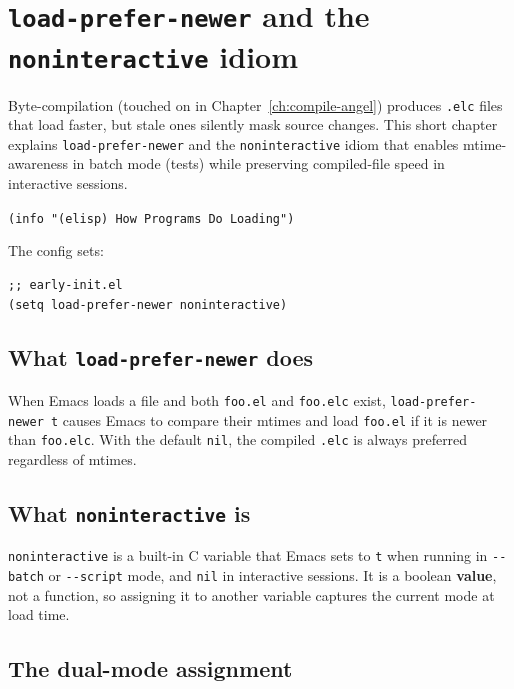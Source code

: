 \chapter{\texttt{load-prefer-newer} and the \texttt{noninteractive} idiom}
\label{ch:load-prefer-newer}
\minitoc\label{load-prefer-newer-and-the-noninteractive-idiom}

Byte-compilation (touched on in Chapter~\ref{ch:compile-angel})
produces \texttt{.elc} files that load faster, but stale ones
silently mask source changes.  This short
chapter explains \texttt{load-prefer-newer} and the
\texttt{noninteractive} idiom that enables mtime-awareness in batch
mode (tests) while preserving compiled-file speed in interactive
sessions.

\texttt{(info "(elisp) How Programs Do Loading")}

The config sets:

\begin{verbatim}
;; early-init.el
(setq load-prefer-newer noninteractive)
\end{verbatim}

\section{What \texttt{load-prefer-newer} does}\label{what-load-prefer-newer-does}

When Emacs loads a file and both \texttt{foo.el} and \texttt{foo.elc} exist, \texttt{load-prefer-newer t} causes Emacs to compare their mtimes and load \texttt{foo.el} if it is newer than \texttt{foo.elc}. With the default \texttt{nil}, the compiled \texttt{.elc} is always preferred regardless of mtimes.

\section{What \texttt{noninteractive} is}\label{what-noninteractive-is}

\texttt{noninteractive} is a built-in C variable that Emacs sets to \texttt{t} when running in \texttt{-\/-batch} or \texttt{-\/-script} mode, and \texttt{nil} in interactive sessions. It is a boolean \textbf{value}, not a function, so assigning it to another variable captures the current mode at load time.

\section{The dual-mode assignment}\label{the-dual-mode-assignment}

